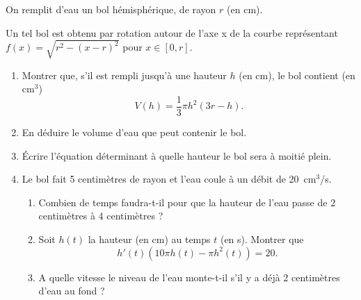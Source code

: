 \begin{exo}
    On remplit d'eau un bol hémisphérique, de rayon $r$ (en {cm}).
    \begin{center}
        
    \end{center}
    Un tel bol est obtenu par rotation autour de l'axe x de la courbe représentant $f(x)=\sqrt{r^{2}-(x-r)^{2}}$ pour $x \in [0,r]$.
    \begin{enumerate}
        \item Montrer que, s'il est rempli jusqu'à une hauteur $h$ (en {cm}), le bol contient (en {cm$^{3}$})
        $$
            V(h)= \frac{1}{3}\pi h^{2}(3r-h).
        $$
        \item En déduire le volume d'eau que peut contenir le bol.
        \item Écrire l'équation déterminant à quelle hauteur le bol sera à moitié plein.
        \item Le bol fait 5 centimètres de rayon et l'eau coule à un débit de {20}~{cm$^3$/s}.

        \noindent
        \begin{minipage}{9.5cm}
            \begin{enumerate}
                \item Combien de temps faudra-t-il pour que la hauteur de l'eau passe de 2 centimètres à 4 centimètres ?
                \item Soit $h(t)$ la hauteur (en {cm}) au temps $t$ (en {s}). Montrer que
                $$
                    h'(t)(10\pi h(t)-\pi h^{2}(t)) = 20.
                $$
                \item A quelle vitesse le niveau de l'eau monte-t-il s'il y a déjà 2 centimètres d'eau au fond ?
            \end{enumerate}
        \end{minipage}
        \begin{minipage}{7cm}
            \vspace{2mm}\hfill
            
        \end{minipage}
    \end{enumerate}
\end{exo}

